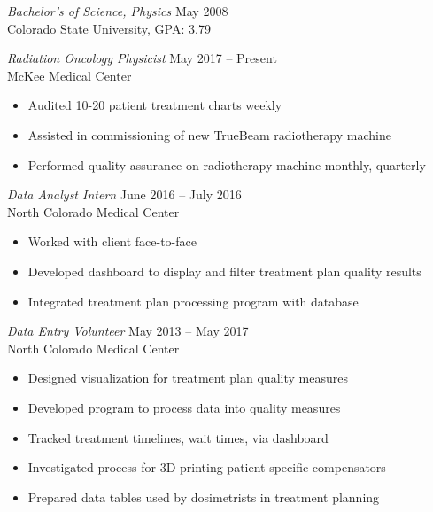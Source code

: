 \documentclass[10pt]{article}
\begin{document}
\begin{description}[leftmargin=!,labelwidth=3cm,align=left,itemsep=-9px,partopsep=-5px]
    \textit{Bachelor's of Science, Physics} \hfill May 2008\\
    Colorado State University, GPA: 3.79
\item[\rule{196mm}{0.5pt}]
%
%
\item[Experience]
    \textit{Radiation Oncology Physicist} \hfill May 2017 -- Present\\
    McKee Medical Center
    \begin{itemize}[rightmargin=2cm,noitemsep]%
        \item Audited 10-20 patient treatment charts weekly
        \item Assisted in commissioning of new TrueBeam radiotherapy machine
        \item Performed quality assurance on radiotherapy machine monthly, quarterly%
    \end{itemize}

    \textit{Data Analyst Intern} \hfill June 2016 -- July 2016\\
    North Colorado Medical Center
    \begin{itemize}[rightmargin=2cm,noitemsep]%
        \item Worked with client face-to-face
        \item Developed dashboard to display and filter treatment plan quality results
        \item Integrated treatment plan processing program with database
    \end{itemize}

    \textit{Data Entry Volunteer} \hfill May 2013 -- May 2017\\
    North Colorado Medical Center
    \begin{itemize}[rightmargin=2cm,noitemsep]%
        \item Designed visualization for treatment plan quality measures
        \item Developed program to process data into quality measures
        \item Tracked treatment timelines, wait times, via dashboard
        \item Investigated process for 3D printing patient specific compensators
        \item Prepared data tables used by dosimetrists in treatment planning
    \end{itemize}


\end{description}
\end{document}
